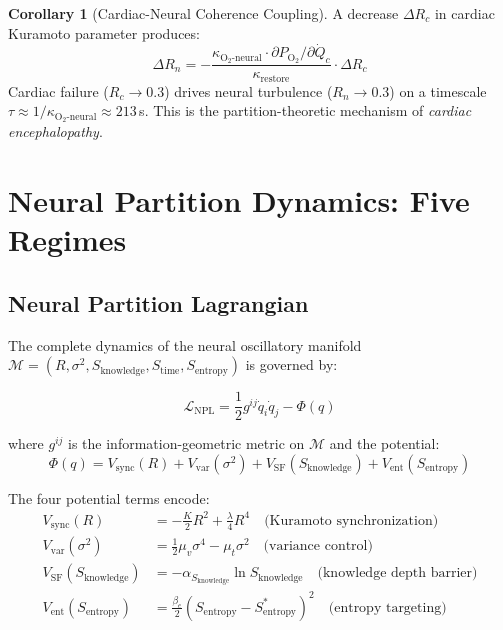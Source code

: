 \documentclass[12pt,a4paper]{article}
\theoremstyle{definition}
\newtheorem{corollary}[theorem]{Corollary}
\newcommand{\SE}{S_{\text{entropy}}}
\newcommand{\SK}{S_{\text{knowledge}}}
\newcommand{\ST}{S_{\text{time}}}
\newcommand{\calM}{\mathcal{M}}
\newcommand{\LNPL}{\mathcal{L}_{\text{NPL}}}
\begin{document}
\begin{corollary}[Cardiac-Neural Coherence Coupling]
A decrease $\Delta R_c$ in cardiac Kuramoto parameter produces:
\begin{equation}
\Delta R_n = -\frac{\kappa_{\text{O}_2\text{-neural}} \cdot \partial P_{\text{O}_2}/\partial \dot{Q}_c}
{\kappa_{\text{restore}}} \cdot \Delta R_c
\end{equation}
Cardiac failure ($R_c \to 0.3$) drives neural turbulence ($R_n \to 0.3$)
on a timescale $\tau \approx 1/\kappa_{\text{O}_2\text{-neural}} \approx 213$\,s.
This is the partition-theoretic mechanism of \emph{cardiac encephalopathy}.
\end{corollary}

\section{Neural Partition Dynamics: Five Regimes}
\label{sec:neural}

\subsection{Neural Partition Lagrangian}

The complete dynamics of the neural oscillatory manifold
$\calM = (R, \sigma^2, \SK, \ST, \SE)$ is governed by:

\begin{equation}
\boxed{\LNPL = \frac{1}{2}g^{ij}\dot{q}_i\dot{q}_j - \Phi(q)}
\end{equation}

where $g^{ij}$ is the information-geometric metric on $\calM$ and the potential:
\begin{equation}
\Phi(q) = V_{\text{sync}}(R) + V_{\text{var}}(\sigma^2) + V_{\text{SF}}(\SK) + V_{\text{ent}}(\SE)
\end{equation}

The four potential terms encode:
\begin{align}
V_{\text{sync}}(R) &= -\frac{K}{2}R^2 + \frac{\lambda}{4}R^4 \quad \text{(Kuramoto synchronization)}\\
V_{\text{var}}(\sigma^2) &= \frac{1}{2}\mu_v \sigma^4 - \mu_t \sigma^2 \quad \text{(variance control)}\\
V_{\text{SF}}(\SK) &= -\alpha_{\SK}\ln\SK \quad \text{(knowledge depth barrier)}\\
V_{\text{ent}}(\SE) &= \frac{\beta_e}{2}(\SE - \SE^*)^2 \quad \text{(entropy targeting)}
\end{align}
\end{document}
